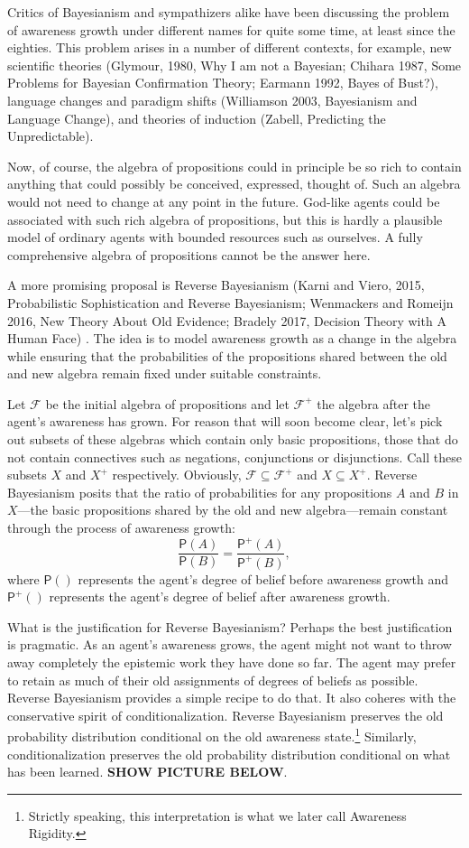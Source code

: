 \documentclass[
  11pt,
  dvipsnames,enabledeprecatedfontcommands]{scrartcl}
\newcommand{\pr}[1]{\ensuremath{\mathsf{P}(#1)}}
\newcommand{\ppr}[2]{\ensuremath{\mathsf{P}^{#1}(#2)}}
\begin{document}
Critics of Bayesianism and sympathizers alike have been discussing the
problem of awareness growth under different names for quite some time,
at least since the eighties. This problem arises in a number of
different contexts, for example, new scientific theories (Glymour, 1980,
Why I am not a Bayesian; Chihara 1987, Some Problems for Bayesian
Confirmation Theory; Earmann 1992, Bayes of Bust?), language changes and
paradigm shifts (Williamson 2003, Bayesianism and Language Change), and
theories of induction (Zabell, Predicting the Unpredictable).

Now, of course, the algebra of propositions could in principle be so
rich to contain anything that could possibly be conceived, expressed,
thought of. Such an algebra would not need to change at any point in the
future. God-like agents could be associated with such rich algebra of
propositions, but this is hardly a plausible model of ordinary agents
with bounded resources such as ourselves. A fully comprehensive algebra
of propositions cannot be the answer here.

A more promising proposal is Reverse Bayesianism (Karni and Viero, 2015,
Probabilistic Sophistication and Reverse Bayesianism; Wenmackers and
Romeijn 2016, New Theory About Old Evidence; Bradely 2017, Decision
Theory with A Human Face) . The idea is to model awareness growth as a
change in the algebra while ensuring that the probabilities of the
propositions shared between the old and new algebra remain fixed under
suitable constraints.

Let \(\mathcal{F}\) be the initial algebra of propositions and let
\(\mathcal{F}^+\) the algebra after the agent's awareness has grown. For
reason that will soon become clear, let's pick out subsets of these
algebras which contain only basic propositions, those that do not
contain connectives such as negations, conjunctions or disjunctions.
Call these subsets \(X\) and \(X^+\) respectively. Obviously,
\(\mathcal{F}\subseteq \mathcal{F}^+\) and \(X\subseteq X^+\). Reverse
Bayesianism posits that the ratio of probabilities for any propositions
\(A\) and \(B\) in \(X\)---the basic propositions shared by the old and
new algebra---remain constant through the process of awareness growth:
\[\frac{\pr{A}}{\pr{B}} = \frac{\ppr{+}{A}}{\ppr{+}{B}},\] where
\(\pr{}\) represents the agent's degree of belief before awareness
growth and \(\ppr{+}{}\) represents the agent's degree of belief after
awareness growth.

What is the justification for Reverse Bayesianism? Perhaps the best
justification is pragmatic. As an agent's awareness grows, the agent
might not want to throw away completely the epistemic work they have
done so far. The agent may prefer to retain as much of their old
assignments of degrees of beliefs as possible. Reverse Bayesianism
provides a simple recipe to do that. It also coheres with the
conservative spirit of conditionalization. Reverse Bayesianism preserves
the old probability distribution conditional on the old awareness
state.\footnote{Strictly speaking, this interpretation is what we later
  call Awareness Rigidity.} Similarly, conditionalization preserves the
old probability distribution conditional on what has been learned.
\textbf{SHOW PICTURE BELOW}.
\end{document}
